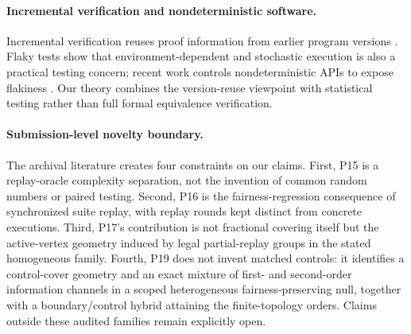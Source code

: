 \paragraph{Incremental verification and nondeterministic software.}
Incremental verification reuses proof information from earlier program versions
\cite{YinEtAl2025}.  Flaky tests show that environment-dependent and stochastic
execution is also a practical testing concern; recent work controls
nondeterministic APIs to expose flakiness \cite{YuanLinShi2026}.  Our theory
combines the version-reuse viewpoint with statistical testing rather than full
formal equivalence verification.

\paragraph{Submission-level novelty boundary.}
The archival literature creates four constraints on our claims.  First, P15 is
a replay-oracle complexity separation, not the invention of common random
numbers or paired testing.  Second, P16 is the fairness-regression consequence
of synchronized suite replay, with replay rounds kept distinct from concrete
executions.  Third, P17's contribution is not fractional covering itself but the
active-vertex geometry induced by legal partial-replay groups in the stated
homogeneous family.  Fourth, P19 does not invent matched controls: it identifies
a control-cover geometry and an exact mixture of first- and second-order
information channels in a scoped heterogeneous fairness-preserving null, together
with a boundary/control hybrid attaining the finite-topology orders. Claims
outside these audited families remain explicitly open.
